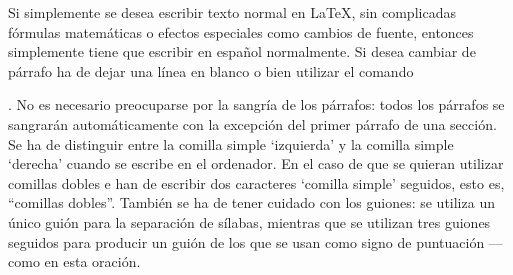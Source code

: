 \documentclass[a4paper,10pt]{letter}
\begin{document}
Si simplemente se desea escribir texto normal en LaTeX,
sin complicadas fórmulas matemáticas o efectos especiales
como cambios de fuente, entonces simplemente tiene que escribir
en español normalmente.
Si desea cambiar de párrafo ha de dejar una línea en blanco o bien
utilizar el comando \par.
No es necesario preocuparse por la sangría de los párrafos:
todos los párrafos se sangrarán automáticamente con la excepción
del primer párrafo de una sección.
Se ha de distinguir entre la comilla simple `izquierda' 
y la comilla simple `derecha' cuando se escribe en el ordenador.
En el caso de que se quieran utilizar comillas dobles e han de
escribir dos caracteres `comilla simple' seguidos, esto es,
``comillas dobles''.
También se ha de tener cuidado con los guiones: se utiliza un único
guión para la separación de sílabas, mientras que se utilizan
tres guiones seguidos para producir un guión de los que se usan
como signo de puntuación --- como en esta oración.
\end{document}
